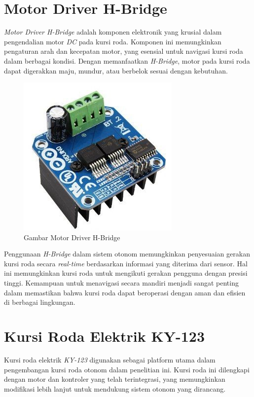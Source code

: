 \section{Motor Driver H-Bridge}
\label{sec:Motor}

\emph{Motor Driver H-Bridge} adalah komponen elektronik yang krusial dalam pengendalian motor \emph{DC} pada kursi roda. Komponen ini memungkinkan pengaturan arah dan kecepatan motor, yang esensial untuk navigasi kursi roda dalam berbagai kondisi. Dengan memanfaatkan \emph{H-Bridge}, motor pada kursi roda dapat digerakkan maju, mundur, atau berbelok sesuai dengan kebutuhan.

\begin{figure}[H]
  \centering
  \includegraphics[scale=0.3]{gambar/Motor Driver H - bridge Bts.jpg}
  \caption{Gambar Motor Driver H-Bridge}
  \label{fig:Gambar Motor Driver H-Bridge}
\end{figure}

Penggunaan \emph{H-Bridge} dalam sistem otonom memungkinkan penyesuaian gerakan kursi roda secara \emph{real-time} berdasarkan informasi yang diterima dari sensor. Hal ini memungkinkan kursi roda untuk mengikuti gerakan pengguna dengan presisi tinggi. Kemampuan untuk menavigasi secara mandiri menjadi sangat penting dalam memastikan bahwa kursi roda dapat beroperasi dengan aman dan efisien di berbagai lingkungan.

\section{Kursi Roda Elektrik KY-123}
\label{sec:KY-123}

Kursi roda elektrik \emph{KY-123} digunakan sebagai platform utama dalam pengembangan kursi roda otonom dalam penelitian ini. Kursi roda ini dilengkapi dengan motor dan kontroler yang telah terintegrasi, yang memungkinkan modifikasi lebih lanjut untuk mendukung sistem otonom yang dirancang.

